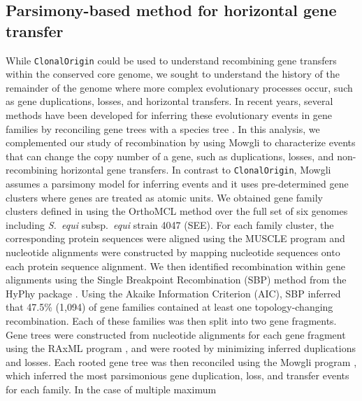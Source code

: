 \documentclass[english]{article}
\begin{document}
\subsection{Parsimony-based method for horizontal gene transfer}
While \texttt{ClonalOrigin} could be used to understand recombining gene
transfers within the conserved core genome, we sought to understand the history
of the remainder of the genome where more complex evolutionary processes occur,
such as gene duplications, losses, and horizontal transfers.  In recent years,
several methods have been developed for inferring these evolutionary events in
gene families by reconciling gene trees with a species tree
\citep{David2011,Doyon2011,Tofigh2011}.  In this analysis, we complemented our
study of recombination by using Mowgli \citep{Doyon2011} to characterize events
that can change the copy number of a gene, such as duplications, losses, and
non-recombining horizontal gene transfers.  In contrast to
\texttt{ClonalOrigin}, Mowgli assumes a parsimony model for inferring events and
it uses pre-determined gene clusters where genes are treated as atomic units.
We obtained gene family clusters defined in \citet{Suzuki2011} using the
OrthoMCL method \citep{Li2003} over the full set of six genomes including
\textit{S.\ equi} subsp.\textit{\ equi} strain 4047 (SEE).  For each family
cluster, the corresponding protein sequences were aligned using the MUSCLE
program \citep{Edgar2004a} and nucleotide alignments were constructed by mapping
nucleotide sequences onto each protein sequence alignment. We then identified
recombination within gene alignments using the Single Breakpoint Recombination
(SBP) method from the HyPhy package \citep{KosakovskyPond2006}.  Using the
Akaike Information Criterion (AIC), SBP inferred that 47.5\% (1,094) of gene
families contained at least one topology-changing recombination. Each of these
families was then split into two gene fragments.  Gene trees were constructed
from nucleotide alignments for each gene fragment using the RAxML program
\citep{Stamatakis2006}, and were rooted by minimizing inferred duplications and
losses.  Each rooted gene tree was then reconciled using the Mowgli program
\citep{Doyon2011}, which inferred the most parsimonious gene duplication, loss,
and transfer events for each family.  In the case of multiple maximum
\end{document}
